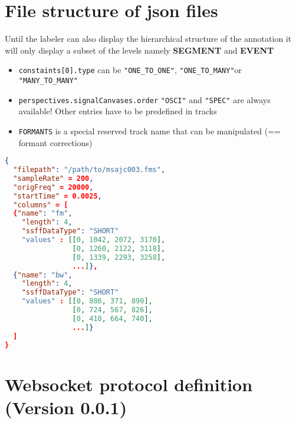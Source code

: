 \documentclass[A4,12pt, utf8]{article}
\begin{document}
\section{File structure of json files}

Until the labeler can also display the hierarchical structure of the annotation it will only 
display a subset of the levels namely \textbf{SEGMENT} and \textbf{EVENT}




\begin{itemize}
  \item \texttt{constaints[0].type} can be \texttt{"ONE\_TO\_ONE"}, \texttt{"ONE\_TO\_MANY"}or \texttt{"MANY\_TO\_MANY"}
  \item \texttt{perspectives.signalCanvases.order} \texttt{"OSCI"} and \texttt{"SPEC"} are always available! Other entries have to be predefined in tracks
  \item \texttt{FORMANTS} is a special reserved track name that can be manipulated (== formant corrections)
\end{itemize}





\begin{lstlisting}[caption=EMU-webApp internal derived signal representation, label=idsr, language=json,firstnumber=1]
{
  "filepath": "/path/to/msajc003.fms",
  "sampleRate" = 200,
  "origFreq" = 20000,
  "startTime" = 0.0025,
  "columns" = [
  {"name": "fm",
    "length": 4,
    "ssffDataType": "SHORT"
    "values" : [[0, 1042, 2072, 3170],
                [0, 1260, 2122, 3118],
                [0, 1339, 2293, 3258],
                ...]},
  {"name": "bw",
    "length": 4,
    "ssffDataType": "SHORT"
    "values" : [[0, 886, 371, 890],
                [0, 724, 567, 826],
                [0, 410, 664, 740],
                ...]}
  ]
}
\end{lstlisting}

\clearpage

\section{Websocket protocol definition (Version 0.0.1)}
\end{document}
